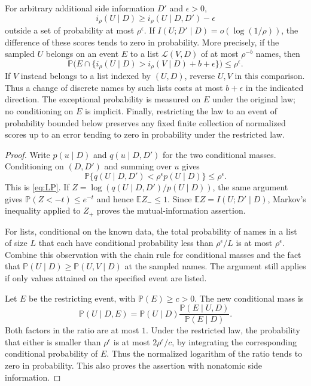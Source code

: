 \begin{lemma}
\label{low:likelihood}
For arbitrary additional side information $D'$ and $\epsilon>0$,
\begin{equation}
 i_\rho(U\mid D)\geq i_\rho(U\mid D,D')-\epsilon
 \tag{LP}\label{eq:LP}
\end{equation}
outside a set of probability at most $\rho^\epsilon$.
If $I(U;D'\mid D)=o(\log(1/\rho))$, the difference of these scores tends
to zero in probability. More precisely, if the sampled $U$ belongs on an
event $E$ to a list $\mathcal L(V,D)$ of at most $\rho^{-b}$ names, then
\[
 \mathbb P\bigl(E\cap\{i_\rho(U\mid D)>
              i_\rho(V\mid D)+b+\epsilon\}\bigr)
 \leq\rho^\epsilon.
\]
If $V$ instead belongs to a list indexed by $(U,D)$, reverse $U,V$ in
this comparison. Thus a change of discrete names by such lists costs at
most $b+\epsilon$ in the indicated direction. The exceptional probability
is measured on $E$ under the original law; no conditioning on $E$ is
implicit. Finally, restricting the law to
an event of probability bounded below preserves any fixed finite collection
of normalized scores up to an error tending to zero in probability under
the restricted law.
\end{lemma}

\begin{proof}
Write $p(u\mid D)$ and $q(u\mid D,D')$ for the two conditional masses.
Conditioning on $(D,D')$ and summing over $u$ gives
\[
 \mathbb P\{q(U\mid D,D')<\rho^\epsilon p(U\mid D)\}
 \leq\rho^\epsilon.
\]
This is \eqref{eq:LP}. If
$Z=\log(q(U\mid D,D')/p(U\mid D))$, the same argument gives
$\mathbb P(Z<-t)\leq e^{-t}$ and hence $\mathbb E Z_-\leq1$.
Since $\mathbb E Z=I(U;D'\mid D)$, Markov's inequality applied to $Z_+$
proves the mutual-information assertion.

For lists, conditional on the known data, the total probability of names
in a list of size $L$ that each have conditional probability less than
$\rho^\epsilon/L$ is at most $\rho^\epsilon$. Combine this observation
with the chain rule for conditional masses and the fact that
$\mathbb P(U\mid D)\geq\mathbb P(U,V\mid D)$ at the sampled names.
The argument still applies if only values attained on the specified
event are listed.

Let $E$ be the restricting event, with $\mathbb P(E)\geq c>0$.
The new conditional mass is
\[
 \mathbb P(U\mid D,E)
 =\mathbb P(U\mid D)
   \frac{\mathbb P(E\mid U,D)}{\mathbb P(E\mid D)}.
\]
Both factors in the ratio are at most $1$. Under the restricted law, the
probability that either is smaller than $\rho^\epsilon$ is at most
$2\rho^\epsilon/c$, by integrating the corresponding conditional
probability of $E$. Thus the normalized logarithm of the ratio tends to
zero in probability. This also proves the assertion with nonatomic side
information.
\end{proof}

